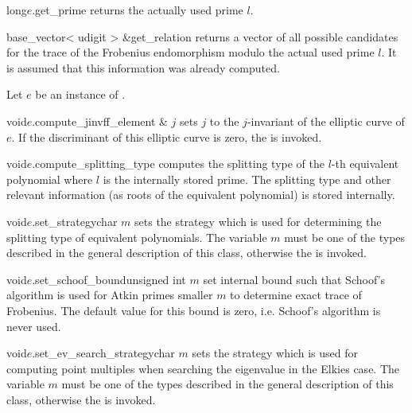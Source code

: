\begin{cfcode}{long}{$e$.get_prime}{}
  returns the actually used prime $l$.
\end{cfcode}

\begin{cfcode}{base_vector< udigit > &}{get_relation}{}
  returns a vector of all possible candidates for the trace of the Frobenius endomorphism modulo
  the actual used prime $l$.  It is assumed that this information was already computed.
\end{cfcode}



\HIGH

Let $e$ be an instance of .

\begin{fcode}{void}{$e$.compute_jinv}{ff_element & $j$}
  sets $j$ to the $j$-invariant of the elliptic curve of $e$.  If the discriminant of this
  elliptic curve is zero, the \LEH is invoked.
\end{fcode}

\begin{fcode}{void}{$e$.compute_splitting_type}{}
  computes the splitting type of the $l$-th equivalent polynomial where $l$ is the internally
  stored prime.  The splitting type and other relevant information (as roots of the equivalent
  polynomial) is stored internally.
\end{fcode}

\begin{fcode}{void}{$e$.set_strategy}{char $m$}
  sets the strategy which is used for determining the splitting type of equivalent polynomials.
  The variable $m$ must be one of the types described in the general description of this class,
  otherwise the \LEH is invoked.
\end{fcode}

\begin{fcode}{void}{$e$.set_schoof_bound}{unsigned int $m$}
  set internal bound such that Schoof's algorithm is used for Atkin primes smaller $m$ to
  determine exact trace of Frobenius.  The default value for this bound is zero, i.e.  Schoof's
  algorithm is never used.
\end{fcode}

\begin{fcode}{void}{$e$.set_ev_search_strategy}{char $m$}
  sets the strategy which is used for computing point multiples when searching the eigenvalue in
  the Elkies case.  The variable $m$ must be one of the types described in the general
  description of this class, otherwise the \LEH is invoked.
\end{fcode}

